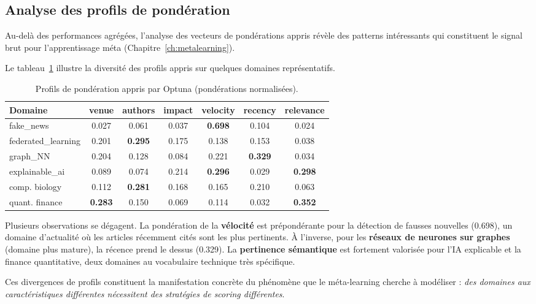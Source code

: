 \subsection{Analyse des profils de pondération}

Au-delà des performances agrégées, l'analyse des vecteurs de pondérations
appris révèle des patterns intéressants qui constituent le signal brut
pour l'apprentissage méta (Chapitre~\ref{ch:metalearning}).

Le tableau~\ref{tab:weight_profiles} illustre la diversité des profils
appris sur quelques domaines représentatifs.

\begin{table}[htbp]
  \centering
  \caption{Profils de pondération appris par Optuna (pondérations normalisées).}
  \label{tab:weight_profiles}
  \begin{tabular}{lcccccc}
    \toprule
    \textbf{Domaine} & \textbf{venue} & \textbf{authors} & \textbf{impact}
      & \textbf{velocity} & \textbf{recency} & \textbf{relevance} \\
    \midrule
    fake\_news & 0.027 & 0.061 & 0.037 & \textbf{0.698} & 0.104 & 0.024 \\
    federated\_learning & 0.201 & \textbf{0.295} & 0.175 & 0.138 & 0.153 & 0.038 \\
    graph\_NN & 0.204 & 0.128 & 0.084 & 0.221 & \textbf{0.329} & 0.034 \\
    explainable\_ai & 0.089 & 0.074 & 0.214 & \textbf{0.296} & 0.029 & \textbf{0.298} \\
    comp. biology & 0.112 & \textbf{0.281} & 0.168 & 0.165 & 0.210 & 0.063 \\
    quant. finance & \textbf{0.283} & 0.150 & 0.069 & 0.114 & 0.032 & \textbf{0.352} \\
    \bottomrule
  \end{tabular}
\end{table}

Plusieurs observations se dégagent. La pondération de la \textbf{vélocité}
est prépondérante pour la détection de fausses nouvelles (0.698), un domaine
d'actualité où les articles récemment cités sont les plus pertinents.
À l'inverse, pour les \textbf{réseaux de neurones sur graphes} (domaine
plus mature), la récence prend le dessus (0.329). La \textbf{pertinence
sémantique} est fortement valorisée pour l'IA explicable et la finance
quantitative, deux domaines au vocabulaire technique très spécifique.

Ces divergences de profils constituent la manifestation concrète
du phénomène que le méta-learning cherche à modéliser :
\textit{des domaines aux caractéristiques différentes nécessitent des
stratégies de scoring différentes}.

